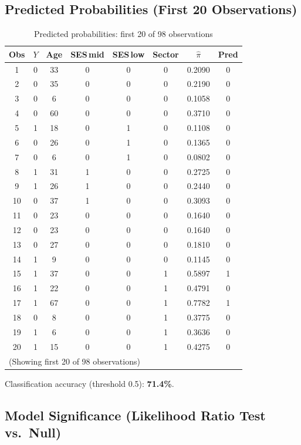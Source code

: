 \documentclass[12pt,a4paper]{article}
\begin{document}
\subsection{Predicted Probabilities (First 20 Observations)}

\begin{table}[H]
\centering
\caption{Predicted probabilities: first 20 of 98 observations}
\footnotesize
\begin{tabular}{cccccccc}
\toprule
Obs & $Y$ & Age & SES\,mid & SES\,low & Sector & $\hat{\pi}$ & Pred \\
\midrule
 1 & 0 & 33 & 0 & 0 & 0 & 0.2090 & 0 \\
 2 & 0 & 35 & 0 & 0 & 0 & 0.2190 & 0 \\
 3 & 0 &  6 & 0 & 0 & 0 & 0.1058 & 0 \\
 4 & 0 & 60 & 0 & 0 & 0 & 0.3710 & 0 \\
 5 & 1 & 18 & 0 & 1 & 0 & 0.1108 & 0 \\
 6 & 0 & 26 & 0 & 1 & 0 & 0.1365 & 0 \\
 7 & 0 &  6 & 0 & 1 & 0 & 0.0802 & 0 \\
 8 & 1 & 31 & 1 & 0 & 0 & 0.2725 & 0 \\
 9 & 1 & 26 & 1 & 0 & 0 & 0.2440 & 0 \\
10 & 0 & 37 & 1 & 0 & 0 & 0.3093 & 0 \\
11 & 0 & 23 & 0 & 0 & 0 & 0.1640 & 0 \\
12 & 0 & 23 & 0 & 0 & 0 & 0.1640 & 0 \\
13 & 0 & 27 & 0 & 0 & 0 & 0.1810 & 0 \\
14 & 1 &  9 & 0 & 0 & 0 & 0.1145 & 0 \\
15 & 1 & 37 & 0 & 0 & 1 & 0.5897 & 1 \\
16 & 1 & 22 & 0 & 0 & 1 & 0.4791 & 0 \\
17 & 1 & 67 & 0 & 0 & 1 & 0.7782 & 1 \\
18 & 0 &  8 & 0 & 0 & 1 & 0.3775 & 0 \\
19 & 1 &  6 & 0 & 0 & 1 & 0.3636 & 0 \\
20 & 1 & 15 & 0 & 0 & 1 & 0.4275 & 0 \\
\bottomrule
\multicolumn{8}{l}{\footnotesize (Showing first 20 of 98 observations)}
\end{tabular}
\end{table}

Classification accuracy (threshold 0.5): \textbf{71.4\%}.

\subsection{Model Significance (Likelihood Ratio Test vs.\ Null)}
\end{document}
